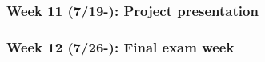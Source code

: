 \subsubsection{Week 11 (7/19-): Project presentation} %
\subsubsection{Week 12 (7/26-): Final exam week}%


